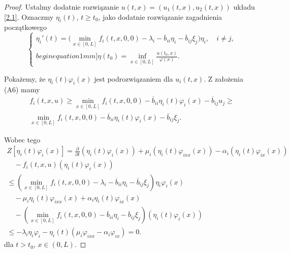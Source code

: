 	\begin{proof}
		Ustalmy dodatnie rozwiązanie $u(t,x) = (u_1(t,x), u_2(t,x))$ układu \eqref{2.1}. Oznaczmy $\eta_i(t)$, $t \ge t_0$, jako dodatnie rozwiązanie zagadnienia początkowego
		\begin{equation}
			\label{3.2}
			\begin{cases}
				\eta_i'(t) = \bigl(\min_{x\in [0,L]} f_i(t,x,0,0) - \lambda_i - \overline{b}_{ii}\eta_i - \overline{b}_{ij}\xi_j\bigr)\eta_i,\quad i\neq j,\\begin{equation}1mm]
				\eta(t_0)=\displaystyle\inf_{x\in[0,L]}\frac{u(t_0,x)}{\varphi(x)}.
			\end{cases}
		\end{equation}
		
		Pokażemy, że $\eta_i(t)\varphi_i(x)$ jest podrozwiązaniem dla $u_i(t,x)$.  
		Z założenia (A6) mamy
		\begin{equation}
			\begin{split}
				f_i(t,x,u) \ge \min_{x\in [0,L]} f_i(t,x,0,0)
				- \overline{b}_{ii} \eta_i(t)\varphi_i(x) - \overline{b}_{ij} u_j 
				\ge \\
				\min_{x\in [0,L]} f_i(t,x,0,0)
				- \overline{b}_{ii} \eta_i(t)\varphi_i(x)
				- \overline{b}_{ij} \xi_j.
			\end{split}
		\end{equation}
		
		Wobec tego
		\begin{equation}
			\begin{split}
				Z[\eta_i(t)\varphi_i(x)] 
				= \frac{\partial}{\partial t}(\eta_i(t)\varphi_i(x))
				+ \mu_i (\eta_i(t)\varphi_{ixx}(x)) 
				- \alpha_i (\eta_i(t)\varphi_{ix}(x)) \\
				\quad - f_i(t,x,u) (\eta_i(t)\varphi_i(x)) \\
				\le 
				(\min_{x\in [0,L]} f_i(t,x,0,0) - \lambda_i - \overline{b}_{ii}\eta_i - \overline{b}_{ij}\xi_j )\eta_i \varphi_i(x) \\
				\quad - \mu_i \eta_i(t)\varphi_{ixx}(x) + \alpha_i \eta_i(t)\varphi_{ix}(x) \\
				\quad - (\min_{x\in [0,L]} f_i(t,x,0,0)  - \overline{b}_{ii}\eta_i - \overline{b}_{ij}\xi_j) (\eta_i(t)\varphi_i(x)) \\
				\le -\lambda_i \eta_i \varphi_i - \eta_i(t) (\mu_i \varphi_{ixx} - \alpha_i \varphi_{ix}) = 0.
			\end{split}
		\end{equation}
		dla $t > t_0$, $x \in (0,L)$.
		

\end{proof}
